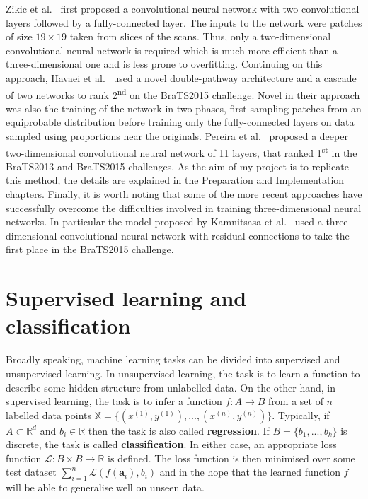 \documentclass[12pt,a4paper,twoside,openright]{report}
\begin{document}
Zikic et al.\ \cite{zikic} first proposed a convolutional neural network with two convolutional layers followed by a fully-connected layer. The inputs to the network were patches of size $19 \times 19$ taken from slices of the scans. Thus, only a two-dimensional convolutional neural network is required which is much more efficient than a three-dimensional one and is less prone to overfitting. Continuing on this approach, Havaei et al.\ \cite{havaei} used a novel double-pathway architecture and a cascade of two networks to rank 2\textsuperscript{nd} on the BraTS2015 challenge. Novel in their approach was also the training of the network in two phases, first sampling patches from an equiprobable distribution before training only the fully-connected layers on data sampled using proportions near the originals. Pereira et al.\ \cite{pereira} proposed a deeper two-dimensional convolutional neural network of 11 layers, that ranked 1\textsuperscript{st} in the BraTS2013 and BraTS2015 challenges. As the aim of my project is to replicate this method, the details are explained in the Preparation and Implementation chapters. Finally, it is worth noting that some of the more recent approaches have successfully overcome the difficulties involved in training three-dimensional neural networks. In particular the model proposed by Kamnitsasa et al.\ \cite{kamnitsas} used a three-dimensional convolutional neural network with residual connections \cite{resnet} to take the first place in the BraTS2015 challenge.

\section{Supervised learning and classification}
Broadly speaking, machine learning tasks can be divided into supervised and unsupervised learning. In unsupervised learning, the task is to learn a function to describe some hidden structure from unlabelled data. On the other hand, in supervised learning, the task is to infer a function $f: A \to B$ from a set of $n$ labelled data points $\mathbb{X} = \{(x^{(1)}, y^{(1)}), ..., (x^{(n)}, y^{(n)})\}$. Typically, if $A \subset \mathbb{R}^d$ and $b_i \in \mathbb{R}$ then the task is also called \textbf{regression}. If $B = \{b_1, ..., b_k\}$ is discrete, the task is called \textbf{classification}. In either case, an appropriate loss function $\mathcal{L}: B \times B \to \mathbb{R}$ is defined. The loss function is then minimised over some test dataset $\sum_{i=1}^n \mathcal{L}(f(\textbf{a}_i), b_i)$ and in the hope that the learned function $f$ will be able to generalise well on unseen data.
\end{document}
